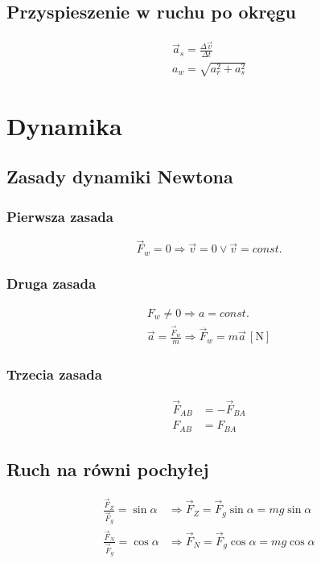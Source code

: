 \documentclass{article}
\numberwithin{equation}{section}
\newcommand{\unit}[1]{\, \left[\mathrm{#1}\right]}
\begin{document}
    \subsection{Przyspieszenie w ruchu po okręgu}
      \begin{gather}
        \vec a_s = \frac{\Delta\vec v}{\Delta t}\\
        a_w = \sqrt{a_r^2 + a_s^2}
      \end{gather}

  \newpage
  \section{Dynamika}
    \subsection{Zasady dynamiki Newtona}
      \subsubsection{Pierwsza zasada}
        \begin{equation}
          \vec F_w = 0 \Rightarrow \vec v = 0 \lor \vec v = const.
        \end{equation}
      \subsubsection{Druga zasada}
        \begin{gather}
          F_w \ne 0 \Rightarrow a = const.\\
          \vec a = \frac{\vec F_w}{m} \Rightarrow \vec F_w = m\vec a \unit{N}
        \end{gather}
      \subsubsection{Trzecia zasada}
        \begin{align}
          \vec F_{AB} &= -\vec F_{BA}\\
          F_{AB} &= F_{BA}
        \end{align}
    \subsection{Ruch na równi pochyłej}
      \begin{align}
        \frac{\vec F_Z}{\vec F_g} = \sin\alpha &\Rightarrow \vec F_Z = \vec F_g\sin\alpha = mg\sin\alpha\\
        \frac{\vec F_N}{\vec F_g} = \cos\alpha &\Rightarrow \vec F_N = \vec F_g\cos\alpha = mg\cos\alpha
      \end{align}
\end{document}
